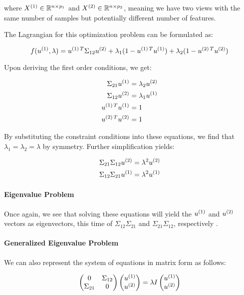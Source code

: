 where \( X^{(1)} \in \mathbb{R}^{n \times p_1} \) and \( X^{(2)} \in \mathbb{R}^{n \times p_2} \), meaning we have two \gls{views} with the same number of samples but potentially different number of features.

The Lagrangian for this optimization problem can be formulated as:

\begin{equation}
    f(u^{(1)}, \lambda) = u^{(1)\,T} \Sigma_{12} u^{(2)} + \lambda_1 (1 - u^{(1)\,T}u^{(1)}) + \lambda_2 (1 - u^{(2)\,T}u^{(2)})
\end{equation}

Upon deriving the first order conditions, we get:

\begin{align}
    \Sigma_{21} u^{(1)} & = \lambda_2 u^{(2)} \\
    \Sigma_{12} u^{(2)} & = \lambda_1 u^{(1)} \\
    u^{(1)\,T}u^{(1)}  & = 1                  \\
    u^{(2)\,T}u^{(2)}  & = 1
\end{align}

By substituting the constraint conditions into these equations, we find that \( \lambda_1 = \lambda_2 = \lambda \) by symmetry. Further simplification yields:

\begin{align}
    \Sigma_{21} \Sigma_{12} u^{(2)} & = \lambda^2 u^{(2)} \\
    \Sigma_{12} \Sigma_{21} u^{(1)} & = \lambda^2 u^{(1)}
\end{align}

\paragraph{Eigenvalue Problem}

Once again, we see that solving these equations will yield the \( u^{(1)} \) and \( u^{(2)} \) vectors as eigenvectors, this time of \( \Sigma_{12} \Sigma_{21} \) and \( \Sigma_{21} \Sigma_{12} \), respectively \citep{hoskuldsson1988pls}.

\paragraph{Generalized Eigenvalue Problem}

We can also represent the system of equations in matrix form as follows:

\begin{align}
    \begin{pmatrix}
        0           & \Sigma_{12} \\
        \Sigma_{21} & 0
    \end{pmatrix}
    \begin{pmatrix}
        u^{(1)} \\
        u^{(2)}
    \end{pmatrix}
    =
    \lambda
    I
    \begin{pmatrix}
        u^{(1)} \\
        u^{(2)}
    \end{pmatrix}
\end{align}

